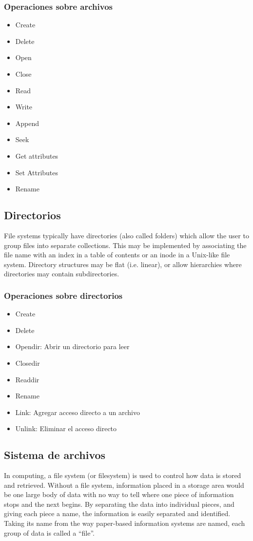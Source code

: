 \documentclass[a4paper, twoside]{article}
\begin{document}
\subsubsection{Operaciones sobre archivos}
\begin{itemize}
	\item Create
	\item Delete
	\item Open
	\item Close
	\item Read
	\item Write
	\item Append
	\item Seek
	\item Get attributes
	\item Set Attributes
	\item Rename
\end{itemize}

\subsection{Directorios}
File systems typically have directories (also called folders) which allow the user to group files into separate collections. This may be implemented by associating the file name with an index in a table of contents or an inode in a Unix-like file system. Directory structures may be flat (i.e. linear), or allow hierarchies where directories may contain subdirectories.

\subsubsection{Operaciones sobre directorios}
\begin{itemize}
	\item Create
	\item Delete
	\item Opendir: Abrir un directorio para leer
	\item Closedir
	\item Readdir
	\item Rename
	\item Link: Agregar acceso directo a un archivo
	\item Unlink: Eliminar el acceso directo
\end{itemize}

\subsection{Sistema de archivos}
In computing, a file system (or filesystem) is used to control how data is stored and retrieved. Without a file system, information placed in a storage area would be one large body of data with no way to tell where one piece of information stops and the next begins. By separating the data into individual pieces, and giving each piece a name, the information is easily separated and identified. Taking its name from the way paper-based information systems are named, each group of data is called a ``file''. 
\end{document}
